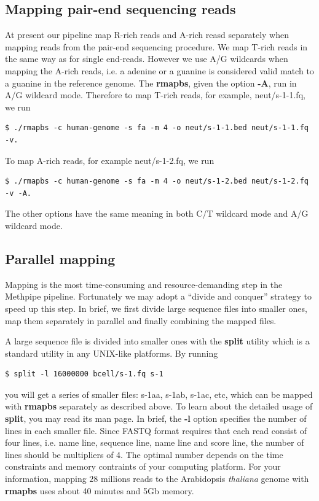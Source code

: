 \documentclass{article}
\begin{document}
\subsection{Mapping pair-end sequencing reads}
\label{sec:mapping-pair-end}
At present our pipeline map R-rich reads and A-rich reasd separately
when mapping reads from the pair-end sequencing procedure. We map
T-rich reads in the same way as for single end-reads. However we use
A/G wildcards when mapping the A-rich reads, i.e. a adenine or a
guanine is considered valid match to a guanine in the reference
genome. The \textbf{rmapbs}, given the option \textbf{-A}, run in A/G
wildcard mode. Therefore to map T-rich reads, for example,
neut/s-1-1.fq, we run
\begin{verbatim}
$ ./rmapbs -c human-genome -s fa -m 4 -o neut/s-1-1.bed neut/s-1-1.fq -v. 
\end{verbatim}
To map A-rich reads, for example neut/s-1-2.fq, we run 
\begin{verbatim}
$ ./rmapbs -c human-genome -s fa -m 4 -o neut/s-1-2.bed neut/s-1-2.fq -v -A. 
\end{verbatim}
The other options have the same meaning in both C/T wildcard mode and
A/G wildcard mode.   

\subsection{Parallel mapping}
\label{sec:parallel-mapping}
Mapping is the most time-consuming and resource-demanding step in the
Methpipe pipeline. Fortunately we may adopt a ``divide and conquer''
strategy to speed up this step.  In brief, we first divide large
sequence files into smaller ones, map them separately in parallel and
finally combining the mapped files.

A large sequence file is divided into smaller ones with the
\textbf{split} utility which is a standard utility in any UNIX-like
platforms. By running
\begin{verbatim}
$ split -l 16000000 bcell/s-1.fq s-1
\end{verbatim}
you will get a series of smaller files: s-1aa, s-1ab, s-1ac, etc,
which can be mapped with \textbf{rmapbs} separately as described
above. To learn about the detailed usage of \textbf{split}, you may
read its man page. In brief, the \textbf{-l} option specifies the
number of lines in each smaller file. Since FASTQ format requires that
each read consist of four lines, i.e. name line, sequence line, name
line and score line, the number of lines should be multipliers of
4. The optimal number depends on the time constraints and memory
contraints of your computing platform. For your information, mapping
$28$ millions reads to the Arabidopsis \textit{thaliana} genome with
\textbf{rmapbs} uses about 40 minutes and 5Gb memory. 
\end{document}
